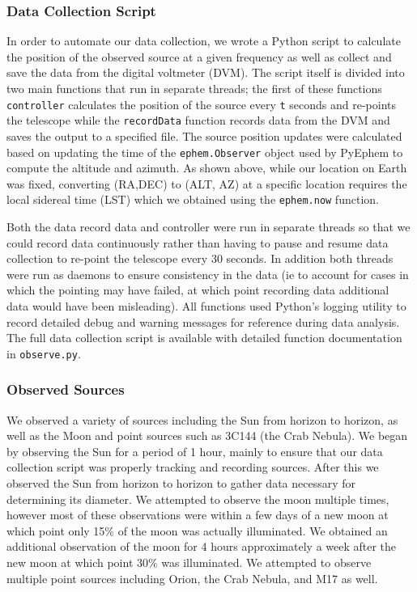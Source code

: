 \documentclass{article}
\begin{document}
  \subsubsection{Data Collection Script}
  In order to automate our data collection, we wrote a Python script to
  calculate the position of the observed source at a given frequency as well as
  collect and save the data from the digital voltmeter (DVM). The script itself is
  divided into two main functions that run in separate threads; the first of
  these functions \lstinline{controller} calculates the position of the source
  every \lstinline{t} seconds and re-points the telescope while the
  \lstinline{recordData} function records data from the DVM and saves the output
  to a specified file. The source position updates were calculated based on
  updating the time of the \lstinline{ephem.Observer} object used by PyEphem to
  compute the altitude and azimuth. As shown above, while our location on Earth
  was fixed, converting (RA,DEC) to (ALT, AZ) at a specific location requires
  the local sidereal time (LST) which we obtained using the
  \lstinline{ephem.now} function.

  Both the data record data and controller were run in separate threads so that
  we could record data continuously rather than having to pause and resume data
  collection to re-point the telescope every 30 seconds. In addition both
  threads were run as daemons to ensure consistency in the data (ie to account
  for cases in which the pointing may have failed, at which point recording data
  additional data would have been misleading). All functions used Python's
  logging utility to record detailed debug and warning messages for reference
  during data analysis. The full data collection script is available with
  detailed function documentation in \lstinline{observe.py}.

  \subsubsection{Observed Sources}
  We observed a variety of sources including the Sun from horizon to horizon, as
  well as the Moon and point sources such as 3C144 (the Crab Nebula). We began
  by observing the Sun for a period of 1 hour, mainly to ensure that our data
  collection script was properly tracking and recording sources. After this we
  observed the Sun from horizon to horizon to gather data necessary for
  determining its diameter. We attempted to observe the moon multiple times,
  however most of these observations were within a few days of a new moon at
  which point only 15\% of the moon was actually illuminated. We obtained
  an additional observation of the moon for 4 hours approximately a week after
  the new moon at which point 30\% was illuminated. We attempted to observe
  multiple point sources including Orion, the Crab Nebula, and M17 as well.
\end{document}
